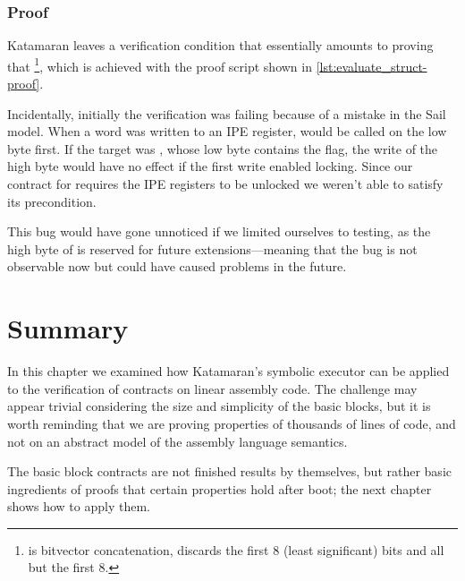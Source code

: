 \subsubsection{Proof}
\label{sec:valid_evaluate_struct}

Katamaran leaves a verification condition that essentially amounts to proving that \footnote{ is bitvector concatenation,  discards the first 8 (least significant) bits and  all but the first 8.}, which is achieved with the proof script shown in \cref{lst:evaluate_struct-proof}.

Incidentally, initially the verification was failing because of a mistake in the Sail model. When a word was written to an IPE register,  would be called on the low byte first. If the target was , whose low byte contains the  flag, the write of the high byte would have no effect if the first write enabled locking. Since our contract for  requires the IPE registers to be unlocked we weren't able to satisfy its precondition.

This bug would have gone unnoticed if we limited ourselves to testing, as the high byte of  is reserved for future extensions---meaning that the bug is not observable now but could have caused problems in the future.

\section{Summary}

In this chapter we examined how Katamaran's symbolic executor can be applied to the verification of contracts on linear assembly code. The challenge may appear trivial considering the size and simplicity of the basic blocks, but it is worth reminding that we are proving properties of thousands of lines of \usail code, and not on an abstract model of the assembly language semantics.

The basic block contracts are not finished results by themselves, but rather basic ingredients of proofs that certain properties hold after boot; the next chapter shows how to apply them.
